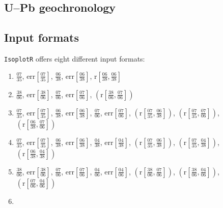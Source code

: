 \begin{refsection}

\chapter{U--Pb geochronology}\label{ch:U-Pb}

\section{Input formats}
\label{sec:UPbFormats}

\texttt{IsoplotR} offers eight different input formats:
\begin{enumerate}
  \item
  $\frac{07}{35}$,  
  $\mbox{err}\!\left[\frac{07}{35}\right]$, 
  $\frac{06}{38}$,  
  $\mbox{err}\!\left[\frac{06}{38}\right]$,  
  $\mbox{r}\!\left[\frac{06}{38},\frac{06}{38}\right]$
  \item $\frac{38}{06}$,  
  $\mbox{err}\!\left[\frac{38}{06}\right]$, 
  $\frac{07}{06}$,  
  $\mbox{err}\!\left[\frac{07}{06}\right]$,  
  $\left(\mbox{r}\!\left[\frac{38}{06},\frac{07}{06}\right]\right)$
  \item
  $\frac{07}{35}$,  
  $\mbox{err}\!\left[\frac{07}{35}\right]$, 
  $\frac{06}{38}$,  
  $\mbox{err}\!\left[\frac{06}{38}\right]$, 
  $\frac{07}{06}$,  
  $\mbox{err}\!\left[\frac{07}{06}\right]$, 
  $\left(\mbox{r}\!\left[\frac{07}{35},\frac{06}{38}\right]\right)$,  
  $\left(\mbox{r}\!\left[\frac{07}{35},\frac{07}{06}\right]\right)$, 
  $\left(\mbox{r}\!\left[\frac{06}{38},\frac{07}{06}\right]\right)$
  \item 
  $\frac{07}{35}$,  
  $\mbox{err}\!\left[\frac{07}{35}\right]$, 
  $\frac{06}{38}$,  
  $\mbox{err}\!\left[\frac{06}{38}\right]$,  
  $\frac{04}{38}$,  
  $\mbox{err}\!\left[\frac{04}{38}\right]$, 
  $\left(\mbox{r}\!\left[\frac{07}{35},\frac{06}{38}\right]\right)$,  
  $\left(\mbox{r}\!\left[\frac{07}{35},\frac{04}{38}\right]\right)$, 
  $\left(\mbox{r}\!\left[\frac{06}{38},\frac{04}{38}\right]\right)$
  \item 
  $\frac{38}{06}$,  
  $\mbox{err}\!\left[\frac{38}{06}\right]$, 
  $\frac{07}{06}$,  
  $\mbox{err}\!\left[\frac{07}{06}\right]$,  
  $\frac{04}{06}$,  
  $\mbox{err}\!\left[\frac{04}{06}\right]$, 
  $\left(\mbox{r}\!\left[\frac{38}{06},\frac{07}{06}\right]\right)$,  
  $\left(\mbox{r}\!\left[\frac{38}{06},\frac{04}{06}\right]\right)$, 
  $\left(\mbox{r}\!\left[\frac{07}{06},\frac{04}{06}\right]\right)$
  \item 

\end{enumerate}
\end{refsection}
